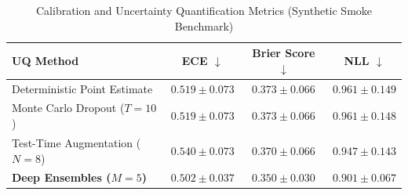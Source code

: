 \begin{table}[h]
\centering
\caption{Calibration and Uncertainty Quantification Metrics (Synthetic Smoke Benchmark)}
\label{tab:uq_calibration}
\begin{tabular}{lccc}
\toprule
UQ Method & ECE $\downarrow$ & Brier Score $\downarrow$ & NLL $\downarrow$ \\
\midrule
Deterministic Point Estimate & $0.519 \pm 0.073$ & $0.373 \pm 0.066$ & $0.961 \pm 0.149$ \\
Monte Carlo Dropout ($T=10$) & $0.519 \pm 0.073$ & $0.373 \pm 0.066$ & $0.961 \pm 0.148$ \\
Test-Time Augmentation ($N=8$) & $0.540 \pm 0.073$ & $0.370 \pm 0.066$ & $0.947 \pm 0.143$ \\
\textbf{Deep Ensembles ($M=5$)} & $0.502 \pm 0.037$ & $0.350 \pm 0.030$ & $0.901 \pm 0.067$ \\
\bottomrule
\end{tabular}
\end{table}